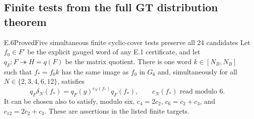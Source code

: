 \subsection{Finite tests from the full GT distribution theorem}

\begin{statement}{E.6}{Proved}{Five simultaneous finite cyclic-cover tests preserve all 24 candidates}
Let $f_0\in F'$ be the explicit gauged word of any E.1 certificate,
and let $q_F:F\twoheadrightarrow H=q(F)$ be the matrix quotient.
There is one word $k\in[N_B,N_B]$ such that $f_*=f_0k$ has the
same image as $f_0$ in $G_6$ and, simultaneously for all
$N\in\{2,3,4,6,12\}$, satisfies
\[
 q_F\delta_N(f_*)=q_F(y)^{c_N(f_*)}q_F(f_*),
 \qquad c_N(f_*)\text{ read modulo }6.
\]
It can be chosen also to satisfy, modulo six,
$c_4=2c_2$, $c_6=c_2+c_3$, and $c_{12}=2c_2+c_3$.
These are assertions in the listed finite targets.
\end{statement}
